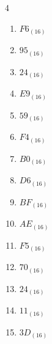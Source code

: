 \begin{multicols}{4}
\begin{enumerate}
        \phantom{$=187$}

  \item $F6_{(16)}$

        \phantom{$=246$}

\columnbreak %

  \item $95_{(16)}$

        \phantom{$=149$}

  \item $24_{(16)}$

        \phantom{$=36$}

  \item $E9_{(16)}$

        \phantom{$=233$}

  \item $59_{(16)}$

        \phantom{$=89$}

  \item $F4_{(16)}$

        \phantom{$=244$}

  \item $B0_{(16)}$

        \phantom{$=176$}

  \item $D6_{(16)}$

        \phantom{$=214$}

  \item $BF_{(16)}$

        \phantom{$=191$}

  \item $AE_{(16)}$

        \phantom{$=174$}

  \item $F5_{(16)}$

        \phantom{$=245$}

  \item $70_{(16)}$

        \phantom{$=112$}

  \item $24_{(16)}$

        \phantom{$=36$}

  \item $11_{(16)}$

        \phantom{$=17$}

  \item $3D_{(16)}$

        \phantom{$=61$}


\end{enumerate}
\end{multicols}
